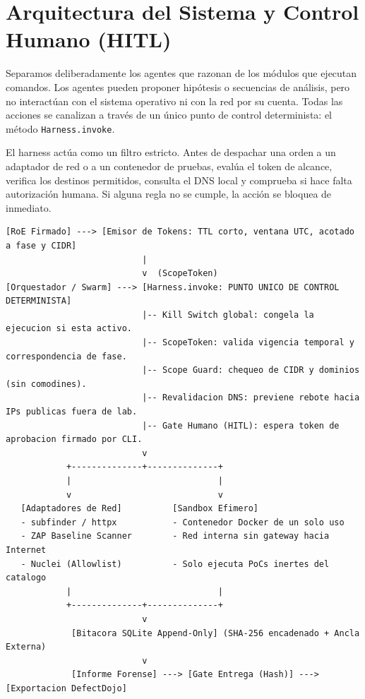 \documentclass[10pt,a4paper]{article}
\begin{document}
\section{Arquitectura del Sistema y Control Humano (HITL)}

Separamos deliberadamente los agentes que razonan de los módulos que ejecutan comandos. Los agentes pueden proponer hipótesis o secuencias de análisis, pero no interactúan con el sistema operativo ni con la red por su cuenta. Todas las acciones se canalizan a través de un único punto de control determinista: el método \texttt{Harness.invoke}.

El harness actúa como un filtro estricto. Antes de despachar una orden a un adaptador de red o a un contenedor de pruebas, evalúa el token de alcance, verifica los destinos permitidos, consulta el DNS local y comprueba si hace falta autorización humana. Si alguna regla no se cumple, la acción se bloquea de inmediato.

\begin{lstlisting}[style=terminalcode]
[RoE Firmado] ---> [Emisor de Tokens: TTL corto, ventana UTC, acotado a fase y CIDR]
                           |
                           v  (ScopeToken)
[Orquestador / Swarm] ---> [Harness.invoke: PUNTO UNICO DE CONTROL DETERMINISTA]
                           |-- Kill Switch global: congela la ejecucion si esta activo.
                           |-- ScopeToken: valida vigencia temporal y correspondencia de fase.
                           |-- Scope Guard: chequeo de CIDR y dominios (sin comodines).
                           |-- Revalidacion DNS: previene rebote hacia IPs publicas fuera de lab.
                           |-- Gate Humano (HITL): espera token de aprobacion firmado por CLI.
                           v
            +--------------+--------------+
            |                             |
            v                             v
   [Adaptadores de Red]          [Sandbox Efimero]
   - subfinder / httpx           - Contenedor Docker de un solo uso
   - ZAP Baseline Scanner        - Red interna sin gateway hacia Internet
   - Nuclei (Allowlist)          - Solo ejecuta PoCs inertes del catalogo
            |                             |
            +--------------+--------------+
                           v
             [Bitacora SQLite Append-Only] (SHA-256 encadenado + Ancla Externa)
                           v
             [Informe Forense] ---> [Gate Entrega (Hash)] ---> [Exportacion DefectDojo]
\end{lstlisting}
\end{document}
